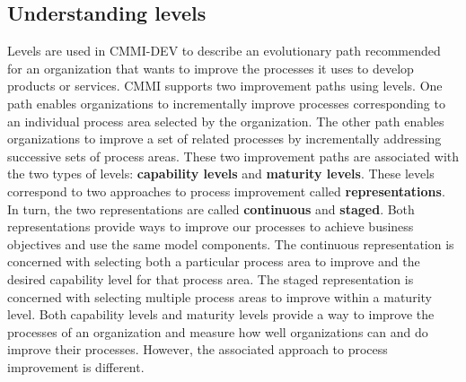 \subsection{Understanding levels}
Levels are used in CMMI-DEV to describe an evolutionary path recommended for an organization that wants to improve the processes it uses to develop products or services.
CMMI supports two improvement paths using levels.
One path enables organizations to incrementally improve processes corresponding to an individual process area selected by the organization.
The other path enables organizations to improve a set of related processes by incrementally addressing successive sets of process areas.
These two improvement paths are associated with the two types of levels: \textbf{capability levels} and \textbf{maturity levels}.
These levels correspond to two approaches to process improvement called \textbf{representations}.
In turn, the two representations are called \textbf{continuous} and \textbf{staged}.
Both representations provide ways to improve our processes to achieve business objectives and use the same model components.
The continuous representation is concerned with selecting both a particular process area to improve and the desired capability level for that process area.
The staged representation is concerned with selecting multiple process areas to improve within a maturity level.
Both capability levels and maturity levels provide a way to improve the processes of an organization and measure how well organizations can and do improve their processes.
However, the associated approach to process improvement is different.

